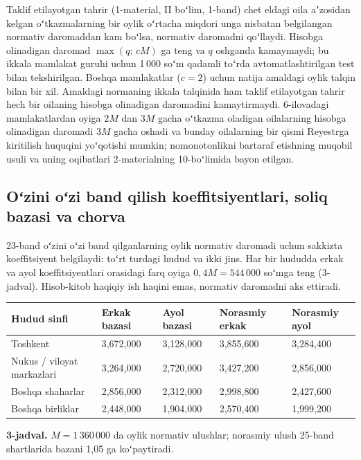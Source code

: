\documentclass[12pt,a4paper]{extarticle}
\begin{document}
Taklif etilayotgan tahrir (1-material, II boʻlim, 1-band) chet eldagi oila aʼzosidan kelgan oʻtkazmalarning bir oylik oʻrtacha miqdori unga nisbatan belgilangan normativ daromaddan kam boʻlsa, normativ daromadni qoʻllaydi. Hisobga olinadigan daromad $\max(q;\,cM)$ ga teng va $q$ oshganda kamaymaydi; bu ikkala mamlakat guruhi uchun 1\,000 soʻm qadamli toʻrda avtomatlashtirilgan test bilan tekshirilgan. Boshqa mamlakatlar ($c=2$) uchun natija amaldagi oylik talqin bilan bir xil. Amaldagi normaning ikkala talqinida ham taklif etilayotgan tahrir hech bir oilaning hisobga olinadigan daromadini kamaytirmaydi. 6-ilovadagi mamlakatlardan oyiga $2M$ dan $3M$ gacha oʻtkazma oladigan oilalarning hisobga olinadigan daromadi $3M$ gacha oshadi va bunday oilalarning bir qismi Reyestrga kiritilish huquqini yoʻqotishi mumkin; nomonotonlikni bartaraf etishning muqobil usuli va uning oqibatlari 2-materialning 10-boʻlimida bayon etilgan.

\subsection{Oʻzini oʻzi band qilish koeffitsiyentlari, soliq bazasi va chorva}
23-band oʻzini oʻzi band qilganlarning oylik normativ daromadi uchun sakkizta koeffitsiyent belgilaydi: toʻrt turdagi hudud va ikki jins. Har bir hududda erkak va ayol koeffitsiyentlari orasidagi farq oyiga $0{,}4M=544\,000$ soʻmga teng (3-jadval). Hisob-kitob haqiqiy ish haqini emas, normativ daromadni aks ettiradi.

\begingroup\fontsize{11bp}{13.2bp}\selectfont
\begin{longtable}{p{} p{} p{} p{} p{}}
\toprule
Hudud sinfi & Erkak bazasi & Ayol bazasi & Norasmiy erkak & Norasmiy ayol \\
\midrule
\endhead
Toshkent & 3,672,000 & 3,128,000 & 3,855,600 & 3,284,400 \\
Nukus / viloyat markazlari & 3,264,000 & 2,720,000 & 3,427,200 & 2,856,000 \\
Boshqa shaharlar & 2,856,000 & 2,312,000 & 2,998,800 & 2,427,600 \\
Boshqa birliklar & 2,448,000 & 1,904,000 & 2,570,400 & 1,999,200 \\
\bottomrule
\end{longtable}
\endgroup
\textbf{3-jadval.} $M=1\,360\,000$ da oylik normativ ulushlar; norasmiy ulush 25-band shartlarida bazani 1,05 ga koʻpaytiradi.
\end{document}

